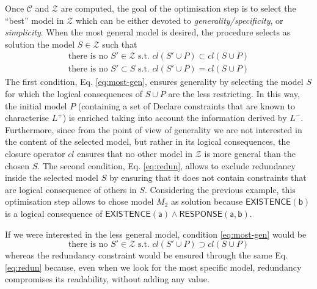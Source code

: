 Once $\mathcal{C}$ and $\mathcal{Z}$ are computed, the goal of the optimisation step is to select the ``best'' model in $\mathcal{Z}$ which can be either devoted to \emph{generality/specificity}, or \emph{simplicity}.
When the most general model is desired, the procedure selects as solution the model $S\in \mathcal{Z}$ such that 
\begin{subequations}
  \begin{align}
    \text{there is no $S'\in\mathcal{Z}$ s.t. } cl(S'\cup P)\subset cl(S\cup P) \label{eq:most-gen}\\
    \text{there is no $S'\subset S$ s.t. } cl(S'\cup P)=cl(S\cup P)\label{eq:redun}
  \end{align}
\end{subequations}
%
The first condition, Eq. \eqref{eq:most-gen}, ensures generality by selecting the model $S$ for which the logical consequences of $S\cup P$ are the less restricting. 
In this way, the initial model $P$ (containing a set of Declare constraints that are known to characterise $L^+$) is enriched taking into account the information derived by $L^-$.
Furthermore, since from the point of view of generality we are not interested in the content of the selected model, but rather in its logical consequences, the closure operator $cl$ ensures that no other model in $\mathcal{Z}$ is more general than the chosen $S$. 
%
The second condition, Eq. \eqref{eq:redun}, allows to exclude redundancy inside the selected model $S$ by ensuring that it does not contain constraints that are logical consequence of others in $S$. Considering the previous example, this optimisation step allows to chose model $M_2$ as solution because $\mathsf{EXISTENCE(b)}$ is a logical consequence of $\mathsf{EXISTENCE(a)} \land  \mathsf{RESPONSE(a,b)}$.

If we were interested in the less general model, condition \eqref{eq:most-gen} would be 
\begin{equation}\label{eq:most-spe}
\text{there is no $S'\in\mathcal{Z}$ s.t. } cl(S'\cup P)\supset cl(S\cup P)
\end{equation}
whereas the redundancy constraint would be ensured through the same Eq. \eqref{eq:redun} because, even when we look for the most specific model, redundancy compromises its readability, without adding any value.

